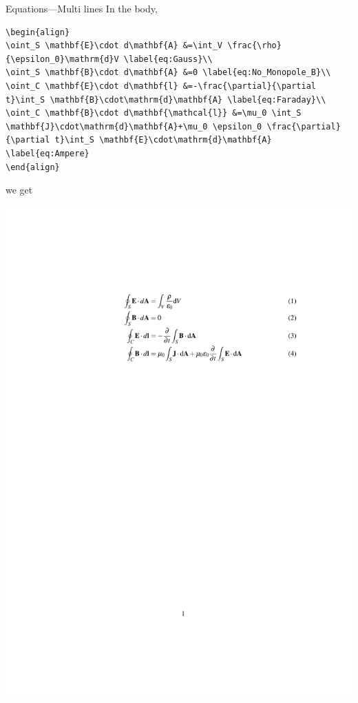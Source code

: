 \documentclass[12pt]{gshs_lecture}
\begin{document}
\begin{frame}[t,fragile]{Equations---Multi lines}\small
In the body,
\begin{block}{}
\begin{lstlisting}
\begin{align}
\oint_S \mathbf{E}\cdot d\mathbf{A} &=\int_V \frac{\rho}{\epsilon_0}\mathrm{d}V \label{eq:Gauss}\\
\oint_S \mathbf{B}\cdot d\mathbf{A} &=0 \label{eq:No_Monopole_B}\\
\oint_C \mathbf{E}\cdot d\mathbf{l} &=-\frac{\partial}{\partial t}\int_S \mathbf{B}\cdot\mathrm{d}\mathbf{A} \label{eq:Faraday}\\
\oint_C \mathbf{B}\cdot d\mathbf{\mathcal{l}} &=\mu_0 \int_S \mathbf{J}\cdot\mathrm{d}\mathbf{A}+\mu_0 \epsilon_0 \frac{\partial}{\partial t}\int_S \mathbf{E}\cdot\mathrm{d}\mathbf{A} \label{eq:Ampere}
\end{align}
\end{lstlisting}
\end{block}
we get
\begin{center}
\begin{framed}
\includegraphics[width=\textwidth,trim={0cm 20.2cm 0cm 5.2cm},clip]{./test_article/article011.pdf}
\end{framed}
\end{center}
\end{frame}
\end{document}

